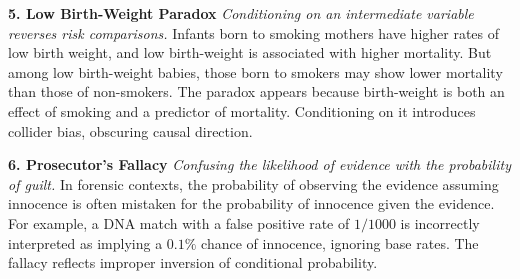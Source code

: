\begin{tcolorbox}[
  colback=gray!2,
  colframe=gray!60,
  boxrule=0.4pt,
  width=\textwidth,
  arc=1pt,
  left=8pt,
  right=8pt,
  top=6pt,
  bottom=6pt,
  shadow={0mm}{-0.5mm}{0mm}{gray!30}
]
\vspace{1em}

\textbf{5. Low Birth-Weight Paradox}  
\emph{Conditioning on an intermediate variable reverses risk comparisons.}  
Infants born to smoking mothers have higher rates of low birth weight, and low birth-weight is associated with higher mortality. But among low birth-weight babies, those born to smokers may show lower mortality than those of non-smokers. The paradox appears because birth-weight is both an effect of smoking and a predictor of mortality. Conditioning on it introduces collider bias, obscuring causal direction.

\vspace{1em}

\textbf{6. Prosecutor’s Fallacy}  
\emph{Confusing the likelihood of evidence with the probability of guilt.}  
In forensic contexts, the probability of observing the evidence assuming innocence is often mistaken for the probability of innocence given the evidence. For example, a DNA match with a false positive rate of $1/1000$ is incorrectly interpreted as implying a $0.1\%$ chance of innocence, ignoring base rates. The fallacy reflects improper inversion of conditional probability.

\end{tcolorbox}

